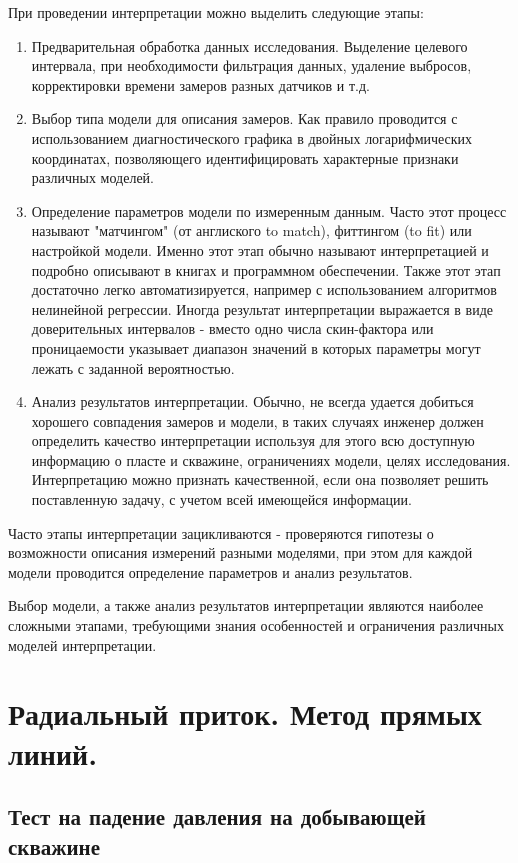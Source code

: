 При проведении интерпретации можно выделить следующие этапы:
\begin{enumerate}
    \item Предварительная обработка данных исследования. Выделение целевого интервала, при необходимости фильтрация данных, удаление выбросов, корректировки времени замеров разных датчиков и т.д.
    \item Выбор типа модели для описания замеров. Как правило проводится с использованием диагностического графика в двойных логарифмических координатах, позволяющего идентифицировать характерные признаки различных моделей.
    \item Определение параметров модели по измеренным данным. Часто этот процесс называют "матчингом" (от англиского to match), фиттингом (to fit) или настройкой модели. Именно этот этап обычно называют интерпретацией и подробно описывают в книгах и программном обеспечении. Также этот этап достаточно легко автоматизируется, например с использованием алгоритмов нелинейной регрессии. Иногда результат интерпретации выражается в виде доверительных интервалов - вместо одно числа скин-фактора или проницаемости указывает диапазон значений в которых параметры могут лежать с заданной вероятностью.
    \item Анализ результатов интерпретации. Обычно, не всегда удается добиться хорошего совпадения замеров и модели, в таких случаях инженер должен определить качество интерпретации используя для этого всю доступную информацию о пласте и скважине, ограничениях модели, целях исследования. Интерпретацию можно признать качественной, если она позволяет решить поставленную задачу, с учетом всей имеющейся информации.  
\end{enumerate}

Часто этапы интерпретации зацикливаются - проверяются гипотезы о возможности описания измерений разными моделями, при этом для каждой модели проводится определение параметров и анализ результатов. 

Выбор модели, а также анализ результатов интерпретации являются наиболее сложными этапами, требующими знания особенностей и ограничения различных моделей интерпретации.


\section{Радиальный приток. Метод прямых линий.}

\subsection{Тест на падение давления на добывающей скважине}

